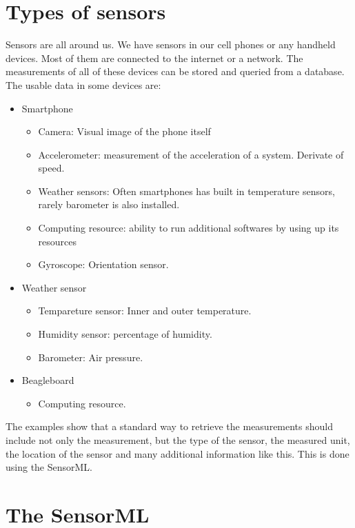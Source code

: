  \section{Types of sensors}
 
 Sensors are all around us. We have sensors in our cell phones or any handheld devices. Most of them are connected to the internet or a network. The measurements of all of these devices can be stored and queried from a database. The usable data in some devices are:
 
 \begin{itemize}
 	\item Smartphone
 	 \begin{itemize}
	 	 \item Camera: Visual image of the phone itself
	 	 \item Accelerometer: measurement of the acceleration of a system. Derivate of speed.
	 	 \item Weather sensors: Often smartphones has built in temperature sensors, rarely barometer is also installed.
	 	 \item Computing resource: ability to run additional softwares by using up its resources
	 	 \item Gyroscope: Orientation sensor.
 	 \end{itemize}
 	 \item Weather sensor
 	 \begin{itemize}
 	 \item Tempareture sensor: Inner and outer temperature.
 	 \item Humidity sensor: percentage of humidity.
 	 \item Barometer: Air pressure.
 	 \end{itemize}
 	 \item Beagleboard
 	 \begin{itemize}
	\item Computing resource.
 	 \end{itemize}
 \end{itemize}

The examples show that a standard way to retrieve the measurements should include not only the measurement, but the type of the sensor, the measured unit, the location of the sensor and many additional information like this. This is done using the SensorML.

\section{The SensorML}

